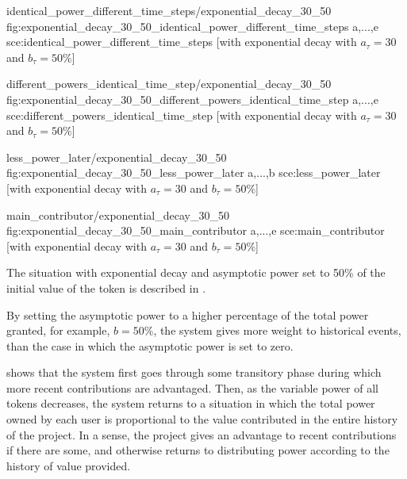 \printPowerFunctionGraphs%
  {identical_power_different_time_steps/exponential_decay_30_50}
  {fig:exponential_decay_30_50_identical_power_different_time_steps}
  {a,...,e}
  {sce:identical_power_different_time_steps}
  [with exponential decay with $a_\tau=30$ and $b_\tau=50\%$]

\printPowerFunctionGraphs%
  {different_powers_identical_time_step/exponential_decay_30_50}
  {fig:exponential_decay_30_50_different_powers_identical_time_step}
  {a,...,e}
  {sce:different_powers_identical_time_step}
  [with exponential decay with $a_\tau=30$ and $b_\tau=50\%$]

\printPowerFunctionGraphs%
  {less_power_later/exponential_decay_30_50}
  {fig:exponential_decay_30_50_less_power_later}
  {a,...,b}
  {sce:less_power_later}
  [with exponential decay with $a_\tau=30$ and $b_\tau=50\%$]

\printPowerFunctionGraphs%
  {main_contributor/exponential_decay_30_50}
  {fig:exponential_decay_30_50_main_contributor}
  {a,...,e}
  {sce:main_contributor}
  [with exponential decay with $a_\tau=30$ and $b_\tau=50\%$]

The situation with exponential decay and asymptotic power set to 50\% of the initial value of the token is described in .%

By setting the asymptotic power to a higher percentage of the total power granted, for example, $b=50\%$, the system gives more weight to historical events, than the case in which the asymptotic power is set to zero.

 shows that the system first goes through some transitory phase during which more recent contributions are advantaged.
Then, as the variable power of all tokens decreases, the system returns to a situation in which the total power owned by each user is proportional to the value contributed in the entire history of the project.
In a sense, the project gives an advantage to recent contributions if there are some, and otherwise returns to distributing power according to the history of value provided.

